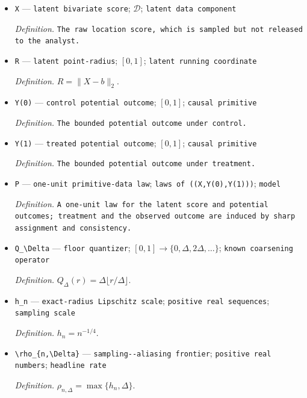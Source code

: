 \documentclass{article}
\begin{document}
\begin{itemize}
  \item \texttt{X} --- \texttt{latent bivariate score}; \(\mathcal D\); \texttt{latent data component}
  \par\smallskip\noindent\emph{Definition.} \texttt{The raw location score,\allowbreak{} which is sampled but not released to the analyst.}
  \item \texttt{R} --- \texttt{latent point-\allowbreak{}radius}; \([0,1]\); \texttt{latent running coordinate}
  \par\smallskip\noindent\emph{Definition.} \(R=\lVert X-b\rVert_2\).
  \item \texttt{Y(0)} --- \texttt{control potential outcome}; \([0,1]\); \texttt{causal primitive}
  \par\smallskip\noindent\emph{Definition.} \texttt{The bounded potential outcome under control.}
  \item \texttt{Y(1)} --- \texttt{treated potential outcome}; \([0,1]\); \texttt{causal primitive}
  \par\smallskip\noindent\emph{Definition.} \texttt{The bounded potential outcome under treatment.}
  \item \texttt{P} --- \texttt{one-\allowbreak{}unit primitive-\allowbreak{}data law}; \texttt{laws of ((X,\allowbreak{}Y(0),\allowbreak{}Y(1)))}; \texttt{model}
  \par\smallskip\noindent\emph{Definition.} \texttt{A one-\allowbreak{}unit law for the latent score and potential outcomes;\allowbreak{} treatment and the observed outcome are induced by sharp assignment and consistency.}
  \item \texttt{Q\_\allowbreak{}\textbackslash{}\allowbreak{}Delta} --- \texttt{floor quantizer}; \([0,1]\to\{0,\Delta,2\Delta,\ldots\}\); \texttt{known coarsening operator}
  \par\smallskip\noindent\emph{Definition.} \(Q_\Delta(r)=\Delta\lfloor r/\Delta\rfloor\).
  \item \texttt{h\_\allowbreak{}n} --- \texttt{exact-\allowbreak{}radius Lipschitz scale}; \texttt{positive real sequences}; \texttt{sampling scale}
  \par\smallskip\noindent\emph{Definition.} \(h_n=n^{-1/4}\).
  \item \texttt{\textbackslash{}\allowbreak{}rho\_\allowbreak{}\{n,\allowbreak{}\textbackslash{}\allowbreak{}Delta\}\allowbreak{}} --- \texttt{sampling-\allowbreak{}-\allowbreak{}aliasing frontier}; \texttt{positive real numbers}; \texttt{headline rate}
  \par\smallskip\noindent\emph{Definition.} \(\rho_{n,\Delta}=\max\{h_n,\Delta\}\).

\end{itemize}
\end{document}
